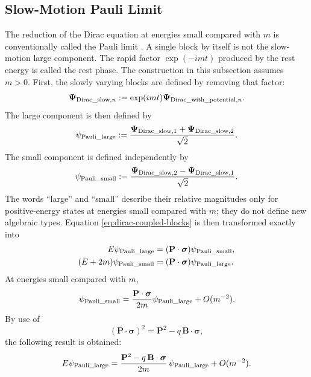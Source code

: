 \documentclass[10pt,letterpaper]{article}
\let\STAamsmathtext\text
\newcommand{\eqtext}[1]{\STAamsmathtext{\normalfont\rmfamily #1}}
\renewcommand{\text}[1]{\STAamsmathtext{\normalfont\rmfamily #1}}
\newcommand{\pv}[1]{#1}
\newcommand{\vct}[1]{\mathbf{#1}}
\newcommand{\sigv}{\vct{\pv{\bm{\sigma}}}}
\newcommand{\bPsi}{\pv{\bm{\Psi}}}
\begin{document}
\subsection{Slow-Motion Pauli Limit}
The reduction of the Dirac equation at energies small compared with \(m\) is
conventionally called the Pauli limit \cite{pauli1927,sakurai2017}. A single
block by itself is not the slow-motion large component. The rapid
factor \(\exp(-imt)\) produced by the rest energy is called the rest phase.
The construction in this subsection assumes \(m>0\).
First, the slowly varying blocks are defined by removing that factor:
\begin{equation}
\bPsi_{\eqtext{Dirac\_slow},n}
:=\exp(imt)\bPsi_{\eqtext{Dirac\_with\_potential},n}.
\label{eq:slow-field-definition}
\end{equation}
The large component is then defined by
\begin{equation}
\pv{\psi}_{\eqtext{Pauli\_large}}
:=\frac{
\bPsi_{\eqtext{Dirac\_slow},1}
+\bPsi_{\eqtext{Dirac\_slow},2}
}{\sqrt{2}}.
\label{eq:large-small}
\end{equation}
The small component is defined independently by
\begin{equation}
\pv{\psi}_{\eqtext{Pauli\_small}}
:=\frac{
\bPsi_{\eqtext{Dirac\_slow},2}
-\bPsi_{\eqtext{Dirac\_slow},1}
}{\sqrt{2}}.
\label{eq:small-component}
\end{equation}
The words ``large'' and ``small'' describe their relative magnitudes only for
positive-energy states at energies small compared with \(m\); they do not
define new algebraic types.
Equation \eqref{eq:dirac-coupled-blocks} is then transformed exactly into
\begin{equation}
\begin{aligned}
E\pv{\psi}_{\eqtext{Pauli\_large}}
&=(\vct{P}\cdot\sigv)\pv{\psi}_{\eqtext{Pauli\_small}},\\
(E+2m)\pv{\psi}_{\eqtext{Pauli\_small}}
&=(\vct{P}\cdot\sigv)\pv{\psi}_{\eqtext{Pauli\_large}}.
\end{aligned}
\label{eq:large-small-coupled}
\end{equation}
At energies small compared with \(m\),
\[
\pv{\psi}_{\eqtext{Pauli\_small}}
=\frac{\vct{P}\cdot\sigv}{2m}
\pv{\psi}_{\eqtext{Pauli\_large}}+O(m^{-2}).
\]
By use of
\[
(\vct{P}\cdot\sigv)^2
=\vct{P}^2-q\,\vct{B}\cdot\sigv,
\]
the following result is obtained:
\begin{equation}
E\pv{\psi}_{\eqtext{Pauli\_large}}
=\frac{\vct{P}^2-q\,\vct{B}\cdot\sigv}{2m}\,
\pv{\psi}_{\eqtext{Pauli\_large}}
+O(m^{-2}).
\label{eq:pauli-operator}
\end{equation}
\end{document}
